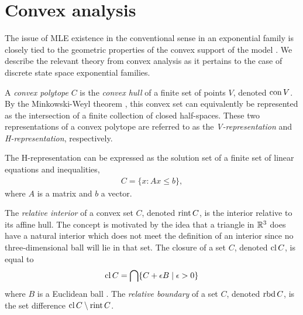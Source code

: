 

\section{Convex analysis} \label{S:Convex analysis}
The issue of MLE existence in the conventional sense in an exponential family is 
closely tied to the geometric properties of 
the convex support of the model \citep{Barndorff, Geyer:gdor, Rinaldo:2009}.  We 
describe the relevant theory from convex analysis as it pertains to the case of 
discrete state space exponential families.

A \emph{convex polytope} $C$ is the \emph{convex hull} of a finite set of points $V$, denoted $\operatorname{con} V$.
By the Minkowski-Weyl theorem \citep[Theorem 19.1]{Rockafellar:1970}, this convex 
set can equivalently be represented as the intersection of a finite collection of 
closed half-spaces.  These two representations of a convex polytope are referred to 
as the \emph{V-representation} and \emph{H-representation}, respectively.  

The H-representation can be expressed as the solution set of a finite set of linear 
equations and inequalities,
\begin{align*}
	C = \{x: Ax \leq b \},
\end{align*}
where $A$ is a matrix and $b$ a vector.

The \emph{relative interior} of a convex set $C$, denoted $\operatorname{rint} C$, is the interior 
relative to its affine hull.  The concept is motivated by the idea that a triangle
in ${\mathbb R}^3$ does have a natural interior which does not meet the definition of an interior
since no three-dimensional ball will lie in that set.  The closure of a set $C$, denoted $\operatorname{cl} C$, is equal to
\begin{align*}
	\operatorname{cl} C = \bigcap \{C + \epsilon B \mid \epsilon > 0 \}
\end{align*}
where $B$ is a Euclidean ball \citep[Section 6]{Rockafellar:1970}.  The \emph{relative boundary} of a set $C$, denoted $\operatorname{rbd} C$, is the set difference $\operatorname{cl} C \setminus \operatorname{rint} C$.

